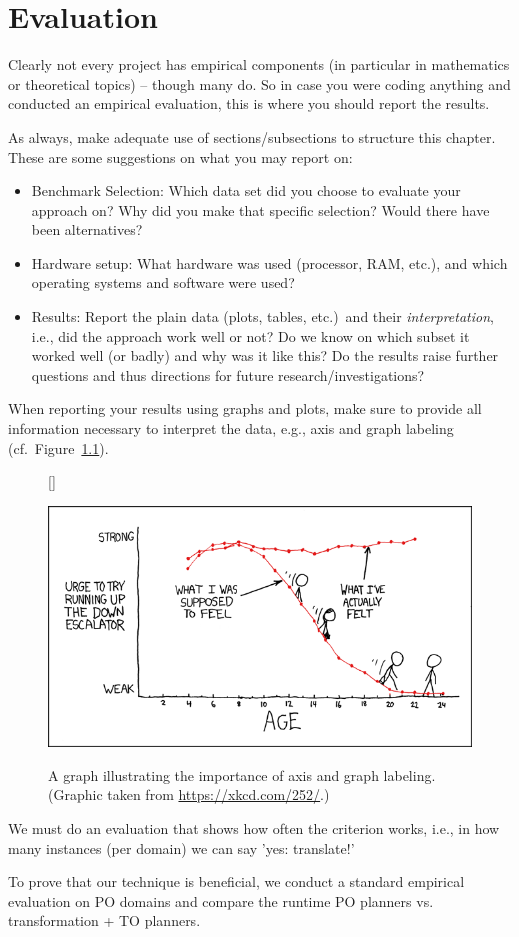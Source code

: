 \chapter{Evaluation}\label{chap:evaluation}

Clearly not every project has empirical components (in particular in mathematics or theoretical topics) -- though many do. So in case you were coding anything and conducted an empirical evaluation, this is where you should report the results.

As always, make adequate use of sections/subsections to structure this chapter. 
These are some suggestions on what you may report on:
\begin{itemize}
  \item Benchmark Selection: Which data set did you choose to evaluate your approach on? Why did you make that specific selection? Would there have been alternatives?
  \item Hardware setup: What hardware was used (processor, RAM, etc.), and which operating systems and software were used?
  \item Results: Report the plain data (plots, tables, etc.)\ and their \emph{interpretation}, i.e., did the approach work well or not? Do we know on which subset it worked well (or badly) and why was it like this? Do the results raise further questions and thus directions for future research/investigations?
\end{itemize}

When reporting your results using graphs and plots, make sure to provide all information necessary to interpret the data, e.g., axis and graph labeling (cf.~Figure~\ref{fig:xkcd}).


  \begin{figure}[bh!]
  [\FBwidth]
  {\caption{A graph illustrating the importance of axis and graph labeling. (Graphic taken from \url{https://xkcd.com/252/}.)\label{fig:xkcd}}}
  {\includegraphics[width=.5\textwidth]{figures/escalators.png}}
  \end{figure}




We must do an evaluation that shows how often the criterion works, i.e., in how many instances (per domain) we can say 'yes: translate!'

To prove that our technique is beneficial, we conduct a standard empirical evaluation on PO domains and compare the runtime PO planners vs. transformation + TO planners.